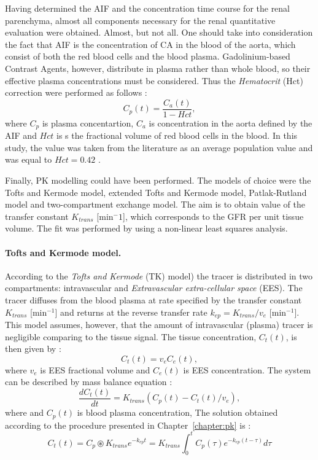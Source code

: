 Having determined the AIF and the concentration time course for the renal pa\-ren\-chy\-ma, almost all components necessary for the renal quantitative evaluation were obtained. Almost, but not all. One should take into consideration the fact that AIF is the concentration of CA in the blood of the aorta, which consist of both the red blood cells and the blood plasma. Gadolinium-based Contrast Agents, however, distribute in plasma rather than whole blood, so their effective plasma concentrations must be considered. Thus the \textit{Hematocrit} (Hct) correction were performed as follows \cite{tofts2010t1}:
\begin{equation}
	\label{eq:hematocrit}
	C_{p}(t) = \frac{C_{a}(t)} {1-Hct},
\end{equation}
where $C_p$ is plasma concentartion, $C_a$ is concentration in the aorta defined by the AIF and $Hct$ is s the fractional volume of red blood cells in the blood. In this study, the value was taken from the literature as an average population value and was equal to $Hct=0.42$ \cite{tofts2010t1}.

Finally, PK modelling could have been performed. The models of choice were the Tofts and Kermode model, extended Tofts and Kermode model, Patlak-Rutland model and two-compartment exchange model. The aim is to obtain value of the transfer constant $K_{trans}$ [min$^-1$], which corresponds to the GFR per unit tissue volume. The fit was performed by using a non-linear least squares analysis.
 
\paragraph{Tofts and Kermode model.}
According to the \textit{Tofts and Kermode} (TK) model) \cite{tofts1991measurement} the tracer is distributed in two compartments: intravascular and \textit{Extravascular extra-cellular space} (EES).
The tracer diffuses from the blood plasma at rate specified by the transfer constant $K_{trans}$ [min$^{-1}$] and returns at the reverse transfer rate $k_{ep} = K_{trans}/v_e$ [min$^{-1}$]. This model assumes, however, that the amount of intravascular (plasma) tracer is negligible comparing to the tissue signal. 
The tissue concentration, $C_t(t)$, is then given by \cite{khalifa2014models}:
\begin{equation}
C_t(t) = v_eC_e(t),
\end{equation}
\noindent where $v_e$ is EES fractional volume and $C_e(t)$ is EES concentration. The system can be described by mass balance equation  \cite{khalifa2014models, tofts1999estimating}: 
\begin{equation}
	\label{eq:toft}
	\frac{dC_{t}(t)}{dt} = K_{trans}(C_p(t)-C_t(t)/v_e),
\end{equation} 
where  and $C_p(t)$ is blood plasma concentration, The solution obtained according to the procedure presented in Chapter~\ref{chapter:pk} is \cite{sourbron2011scope, khalifa2014models}:
\begin{equation}
	\label{eq:toft2}
	C_{t}(t) =C_p\circledast K_{trans}e^{-k_{ep}t} =K_{trans}\int_{0}^{t}C_p(\tau)e^{-k_{ep}(t-\tau)}d\tau  
\end{equation}
\newpage
